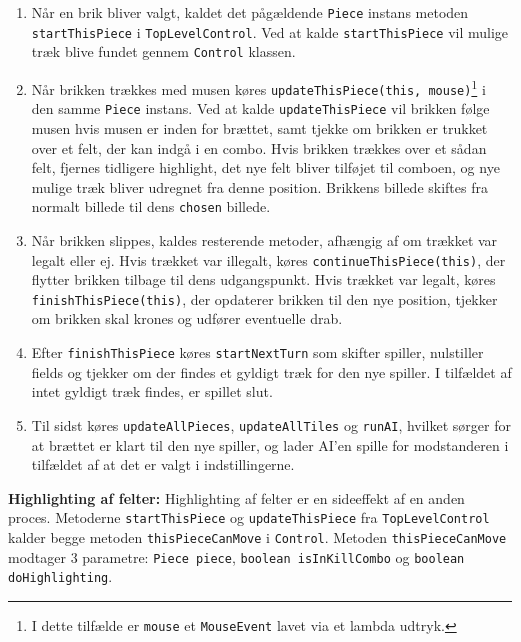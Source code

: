 \begin{enumerate}
    \item Når en brik bliver valgt, kaldet det pågældende \texttt{Piece} instans metoden \texttt{startThisPiece} i \texttt{TopLevelControl}. Ved at kalde \texttt{startThisPiece} vil mulige træk blive fundet gennem \texttt{Control} klassen.
    
    \item Når brikken trækkes med musen køres \texttt{updateThisPiece(this, mouse)}\footnote{I dette tilfælde er \texttt{mouse} et \texttt{MouseEvent} lavet via et lambda udtryk.} i den samme \texttt{Piece} instans. Ved at kalde \texttt{updateThisPiece} vil brikken følge musen hvis musen er inden for brættet, samt tjekke om brikken er trukket over et felt, der kan indgå i en combo. Hvis brikken trækkes over et sådan felt, fjernes tidligere highlight, det nye felt bliver tilføjet til comboen, og nye mulige træk bliver udregnet fra denne position. Brikkens billede skiftes fra normalt billede til dens \texttt{chosen} billede.
    
    \item Når brikken slippes, kaldes resterende metoder, afhængig af om trækket var legalt eller ej. Hvis trækket var illegalt, køres \texttt{continueThisPiece(this)}, der flytter brikken tilbage til dens udgangspunkt. Hvis trækket var legalt, køres \texttt{finishThisPiece(this)}, der opdaterer brikken til den nye position, tjekker om brikken skal krones og udfører eventuelle drab. 
    \item Efter \texttt{finishThisPiece} køres \texttt{startNextTurn} som skifter spiller, nulstiller fields og tjekker om der findes et gyldigt træk for den nye spiller. I tilfældet af intet gyldigt træk findes, er spillet slut.
    
    \item Til sidst køres \texttt{updateAllPieces}, \texttt{updateAllTiles} og \texttt{runAI}, hvilket sørger for at brættet er klart til den nye spiller, og lader AI'en spille for modstanderen i tilfældet af at det er valgt i indstillingerne. 
\end{enumerate}

\textbf{Highlighting af felter:}  
Highlighting af felter er en sideeffekt af en anden proces. Metoderne \texttt{startThisPiece} og \texttt{updateThisPiece} fra \texttt{TopLevelControl} kalder begge metoden \texttt{thisPieceCanMove} i \texttt{Control}. Metoden \texttt{thisPieceCanMove} modtager 3 parametre: \texttt{Piece piece}, \texttt{boolean isInKillCombo} og \texttt{boolean doHighlighting}. 

